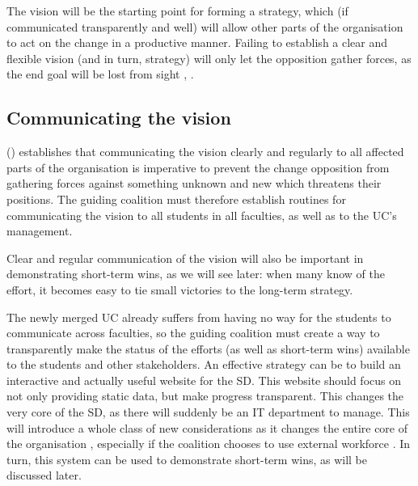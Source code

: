 The vision will be the starting point for forming a strategy, which (if communicated transparently and well) will allow other parts of the organisation to act on the change in a productive manner. Failing to establish a clear and flexible vision (and in turn, strategy) will only let the opposition gather forces, as the end goal will be lost from sight \autocite{luftman:managing-the-information-technology-resource:2009}, \autocite{peng-liu-tao:analyzing-the-pathway-of-organizational-change-based-on-the-environmental-complexity}.

\subsection{Communicating the vision}

\citeauthor{kotter:leading-change-why-transformation-efforts-fail:1995} (\citeyear{kotter:leading-change-why-transformation-efforts-fail:1995}) establishes that communicating the vision clearly and regularly to all affected parts of the organisation is imperative to prevent the change opposition from gathering forces against something unknown and new which threatens their positions. The guiding coalition must therefore establish routines for communicating the vision to all students in all faculties, as well as to the UC's management.

Clear and regular communication of the vision will also be important in demonstrating short-term wins, as we will see later: when many know of the effort, it becomes easy to tie small victories to the long-term strategy.

The newly merged UC already suffers from having no way for the students to communicate across faculties, so the guiding coalition must create a way to transparently make the status of the efforts (as well as short-term wins) available to the students and other stakeholders. An effective strategy can be to build an interactive and actually useful website for the SD. This website should focus on not only providing static data, but make progress transparent. This changes the very core of the SD, as there will suddenly be an IT department to manage. This will introduce a whole class of new considerations as it changes the entire core of the organisation \autocite{luftman:managing-the-information-technology-resource:2009}, especially if the coalition chooses to use external workforce \autocite{o-mahoney-markham:management-consultancy:2013}. In turn, this system can be used to demonstrate short-term wins, as will be discussed later.

